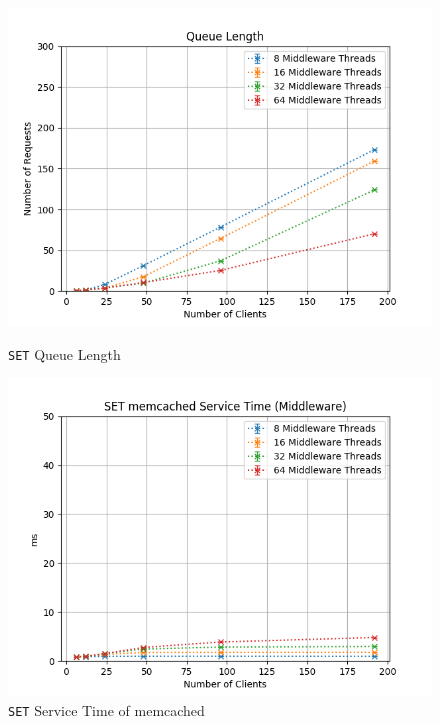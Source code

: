 \documentclass[11pt,a4paper]{article}
\begin{document}
\begin{figure}[H]
	\centering
    \begin{minipage}{0.5\textwidth}
        \includegraphics[width=\textwidth]{../illustrations/plots/2_1_one_middleware/1-0/middleware_queue_length.png}
        \caption{\texttt{SET} Queue Length}
        \label{fig:one_middleware_set_ql}
    \end{minipage}\hfill
    \begin{minipage}{0.5\textwidth}
        \centering
        \includegraphics[width=\textwidth]{../illustrations/plots/2_1_one_middleware/1-0/middleware_set_service_time_ms.png}
        \caption{\texttt{SET} Service Time of memcached}
        \label{fig:one_middleware_set_st_mw}
    \end{minipage}
\end{figure}
\end{document}
